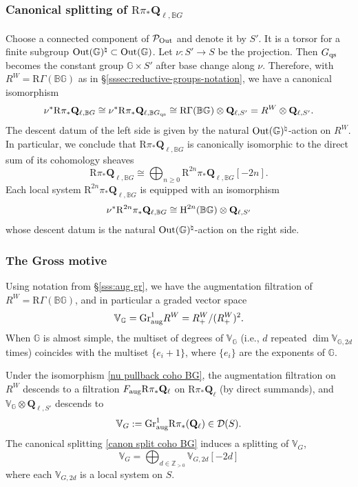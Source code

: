 \documentclass[reqno]{amsart}
\numberwithin{equation}{subsection}
\theoremstyle{definition}
\def\BB{\mathbb{B}}
\def\GG{\mathbb{G}}
\def\VV{\mathbb{V}}
\def\ZZ{\mathbb{Z}}
\newcommand\cD{\mathcal{D}}
\newcommand\cP{\mathcal{P}}
\newcommand{\Gr}{\textup{Gr}}
\newcommand\Out{\textup{Out}}
\newcommand\upH{\textup{H}}
\newcommand{\Ql}{\Q_{\ell}}
\newcommand\ot{\otimes}
\newcommand\na{\natural}
\newcommand\aug{\textup{aug}}
\newcommand\qs{\textup{qs}}
\newcommand{\Q}{\mathbf{Q}}
\newcommand{\Qll}[1]{\Q_{\ell, #1}}
\newcommand{\RGamma}{\rR \Gamma}
\newcommand{\rR}{\ensuremath{\mathrm{R}}\xspace}
\begin{document}
\subsubsection{Canonical splitting of $\rR \pi_* \Qll{\BB G}$}\label{sss:splitting}
Choose a connected component of $\cP_{\Out}$ and denote it by $S'$. It is a torsor for a finite subgroup $\Out(\GG)^{\na}\subset \Out(\GG)$. Let 
$\nu: S'\to S$ be the projection. Then $G_{\qs}$ becomes the constant group $\GG\times S'$ after base change along $\nu$. Therefore, with $R^W = \RGamma(\BB \GG)$ as in \S\ref{sssec:reductive-groups-notation}, we have a canonical isomorphism
\begin{equation}\label{nu pullback coho BG}
\nu^{*}\rR \pi_* \Qll{\BB G}\cong \nu^{*}\rR \pi_* \Qll{\BB G_{\qs}}\cong \RGamma(\BB \GG)\ot \Qll{S'}=R^{W}\ot \Qll{S'}.
\end{equation}
 The descent datum of the left side is given by the natural $\Out(\GG)^{\na}$-action on $R^{W}$. In particular, we conclude that $\rR \pi_* \Qll{\BB G}$  is canonically isomorphic to the direct sum of its cohomology sheaves
\begin{equation}\label{canon split coho BG}
\rR \pi_* \Qll{\BB G}\cong \bigoplus_{n\ge0}\rR^{2n} \pi_* \Qll{\BB G}[-2n].
\end{equation}
Each local system $\rR^{2n} \pi_* \Qll{\BB G}$ is equipped with an isomorphism 
\begin{equation*}
\nu^{*}\rR^{2n} \pi_* \Qll{\BB G}\cong \upH^{2n}(\BB \GG)\ot\Qll{S'}
\end{equation*}
whose descent datum is the natural $\Out(\GG)^{\na}$-action on the right side.

\subsubsection{The Gross motive}\label{sss:motive}

Using notation from \S\ref{sss:aug gr}, we have the augmentation filtration of $R^{W}=\rR\Gamma(\BB\GG)$, and in particular a graded vector space
\begin{equation}\label{def M}
\VV_{\GG}=\Gr^{1}_{\aug}R^{W}=R^{W}_{+}/(R^{W}_{+})^{2}.
\end{equation}
When $\GG$ is almost simple, the multiset of degrees of $\VV_{\GG}$ (i.e., $d$ repeated $\dim \VV_{\GG, 2d}$ times) coincides with the multiset $\{e_{i}+1\}$, where $\{e_{i}\}$ are the exponents of $\GG$.

Under the isomorphism \eqref{nu pullback coho BG}, the augmentation filtration on $R^{W}$ descends to a filtration $F_{\aug}\rR \pi_* \Ql$ on $\rR \pi_* \Ql$ (by direct summands), and $\VV_{\GG}\ot \Qll{S'}$ descends to
\begin{equation*}
\VV_{G}:=\Gr^1_{\aug} \rR \pi_* (\Ql) \in \cD(S).
\end{equation*}
The canonical splitting \eqref{canon split coho BG} induces a splitting of $\VV_{G}$,
\[
\VV_{G} = \bigoplus_{d\in \ZZ_{>0}} \VV_{G,2d}[-2d]
\]
where each $\VV_{G,2d}$ is a local system on $S$.
\end{document}
